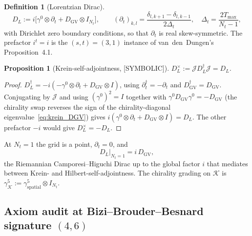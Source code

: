 \documentclass[11pt,a4paper]{article}
\theoremstyle{plain}
\newtheorem{proposition}[theorem]{Proposition}
\theoremstyle{definition}
\newtheorem{definition}[theorem]{Definition}
\newcommand{\Krein}{\mathcal{K}}
\newcommand{\Nt}{N_t}
\newcommand{\DGV}{D_{\mathrm{GV}}}
\newcommand{\DL}{D_{L}}
\begin{document}
\begin{definition}[Lorentzian Dirac]\label{def:lorentzian_dirac}
\begin{equation}\label{eq:DL_def}
   \DL := i\bigl[\gamma^0 \otimes \partial_t + \DGV \otimes I_{\Nt}\bigr],
   \qquad
   (\partial_t)_{k,l} = \frac{\delta_{l,k+1} - \delta_{l,k-1}}{2\Delta_t},
   \quad \Delta_t = \frac{2T_{\max}}{\Nt - 1},
\end{equation}
with Dirichlet zero boundary conditions, so that $\partial_t$ is real
skew-symmetric.  The prefactor $i^t = i$ is the $(s, t) = (3, 1)$
instance of van~den~Dungen's Proposition~4.1.
\end{definition}

\begin{proposition}[Krein-self-adjointness, {[SYMBOLIC]}]
\label{prop:krein_self_adjoint}
$\DL^\times := \mathcal{J}\DL^\dagger\mathcal{J} = \DL$.
\end{proposition}

\begin{proof}
$\DL^\dagger = -i(-\gamma^0\otimes\partial_t + \DGV\otimes I)$, using
$\partial_t^\dagger = -\partial_t$ and $\DGV^\dagger = \DGV$.  Conjugating
by $\mathcal{J}$ and using $(\gamma^0)^2 = I$ together with
$\gamma^0\DGV\gamma^0 = -\DGV$ (the chirality swap reverses the sign of
the chirality-diagonal eigenvalue~\eqref{eq:krein_DGV}) gives
$i(\gamma^0\otimes\partial_t + \DGV\otimes I) = \DL$.  The other
prefactor $-i$ would give $\DL^\times = -\DL$.
\end{proof}

At $\Nt = 1$ the grid is a point, $\partial_t = 0$, and
\begin{equation}\label{eq:DL_riemannian_limit}
   \DL\big|_{\Nt = 1} = i\,\DGV,
\end{equation}
the Riemannian Camporesi--Higuchi Dirac up to the global factor $i$
that mediates between Krein- and Hilbert-self-adjointness.  The chirality
grading on $\Krein$ is $\gamma^5_{\Krein} := \gamma^5_{\mathrm{spatial}}
\otimes I_{\Nt}$.

\subsection{Axiom audit at Bizi--Brouder--Besnard signature $(4, 6)$}
\label{sec:bbb_audit}
\end{document}
